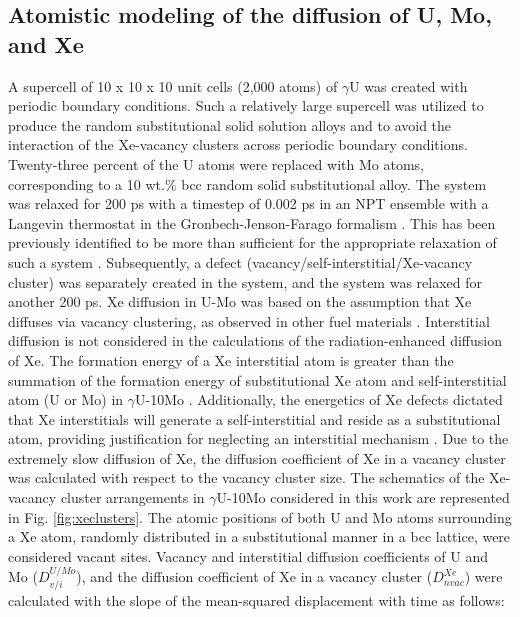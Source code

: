 \documentclass[preprint,12pt]{elsarticle}
\begin{document}
\subsection{Atomistic modeling of the diffusion of U, Mo, and Xe}
\label{sec:DC_UMoXe}
\indent A supercell of 10 x 10 x 10 unit cells (2,000 atoms) of $\gamma$U was created with periodic boundary conditions. Such a relatively large supercell was utilized to produce the random substitutional solid solution alloys and to avoid the interaction of the Xe-vacancy clusters across periodic boundary conditions. Twenty-three percent of the U atoms were replaced with Mo atoms, corresponding to a 10 wt.$\%$ bcc random solid substitutional alloy. The system was relaxed for 200 ps with a timestep of 0.002 ps in an NPT ensemble with a Langevin thermostat in the Gronbech-Jenson-Farago formalism \cite{gronbech2013simple, gronbech2014application}. This has been previously identified to be more than sufficient for the appropriate relaxation of such a system \cite{park2021atomistic}. Subsequently, a defect (vacancy/self-interstitial/Xe-vacancy cluster) was separately created in the system, and the system was relaxed for another 200 ps. Xe diffusion in U-Mo was based on the assumption that Xe diffuses via vacancy clustering, as observed in other fuel materials \cite{perriot2019atomistic, andersson2019density, andersson2011u, thompson2013pathway, bes2015experimental}. Interstitial diffusion is not considered in the calculations of the radiation-enhanced diffusion of Xe. The formation energy of a Xe interstitial atom is greater than the summation of the formation energy of substitutional Xe atom and self-interstitial atom (U or Mo) in $\gamma$U-10Mo \cite{beeler2011formation, beeler2012first, beeler2020improved}. Additionally, the energetics of Xe defects dictated that Xe interstitials will generate a self-interstitial and reside as a substitutional atom, providing justification for neglecting an interstitial mechanism  \cite{beeler2011formation, beeler2012first, beeler2020improved}.  Due to the extremely slow diffusion of Xe, the diffusion coefficient of Xe in a vacancy cluster was calculated with respect to the vacancy cluster size. The schematics of the Xe-vacancy cluster arrangements in $\gamma$U-10Mo considered in this work are represented in Fig. \ref{fig:xeclusters}. The atomic positions of both U and Mo atoms surrounding a Xe atom, randomly distributed in a substitutional manner in a bcc lattice, were considered vacant sites. Vacancy and interstitial diffusion coefficients of U and Mo ($D_{v/i}^{U/Mo}$), and the diffusion coefficient of Xe in a vacancy cluster ($D_{nvac}^{Xe}$) were calculated with the slope of the mean-squared displacement with time as follows:
\\
\end{document}
